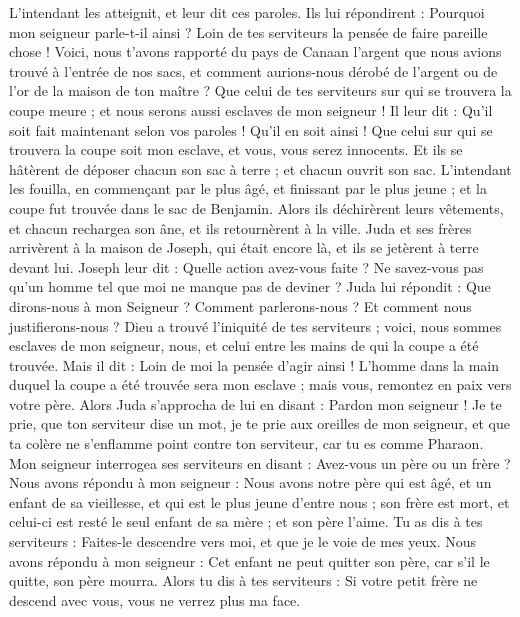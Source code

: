 \begin{multicols}{2}
L’intendant les atteignit, et leur dit ces paroles.
Ils lui répondirent : Pourquoi mon seigneur parle-t-il ainsi ? Loin de tes serviteurs la pensée de faire pareille chose !
Voici, nous t'avons rapporté du pays de Canaan l'argent que nous avions trouvé à l’entrée de nos sacs, et comment aurions-nous dérobé de l'argent ou de l'or de la maison de ton maître ?
Que celui de tes serviteurs sur qui se trouvera la coupe meure ; et nous serons aussi esclaves de mon seigneur !
Il leur dit : Qu'il soit fait maintenant selon vos paroles ! Qu’il en soit ainsi ! Que celui sur qui se trouvera la coupe soit mon esclave, et vous, vous serez innocents.
Et ils se hâtèrent de déposer chacun son sac à terre ; et chacun ouvrit son sac.
L’intendant les fouilla, en commençant par le plus âgé, et finissant par le plus jeune ; et la coupe fut trouvée dans le sac de Benjamin.
Alors ils déchirèrent leurs vêtements, et chacun rechargea son âne, et ils retournèrent à la ville.
Juda et ses frères arrivèrent à la maison de Joseph, qui était encore là, et ils se jetèrent à terre devant lui.
Joseph leur dit : Quelle action avez-vous faite ? Ne savez-vous pas qu'un homme tel que moi ne manque pas de deviner ?
Juda lui répondit : Que dirons-nous à mon Seigneur ? Comment parlerons-nous ? Et comment nous justifierons-nous ? Dieu a trouvé l'iniquité de tes serviteurs ; voici, nous sommes esclaves de mon seigneur, nous, et celui entre les mains de qui la coupe a été trouvée.
Mais il dit : Loin de moi la pensée d’agir ainsi ! L’homme dans la main duquel la coupe a été trouvée sera mon esclave ; mais vous, remontez en paix vers votre père.
Alors Juda s'approcha de lui en disant : Pardon mon seigneur ! Je te prie, que ton serviteur dise un mot, je te prie aux oreilles de mon seigneur, et que ta colère ne s'enflamme point contre ton serviteur, car tu es comme Pharaon.
Mon seigneur interrogea ses serviteurs en disant : Avez-vous un père ou un frère ?
Nous avons répondu à mon seigneur : Nous avons notre père qui est âgé, et un enfant de sa vieillesse, et qui est le plus jeune d'entre nous ; son frère est mort, et celui-ci est resté le seul enfant  de sa mère ; et son père l'aime.
Tu as dis à tes serviteurs : Faites-le descendre vers moi, et que je le voie de mes yeux.
Nous avons répondu  à mon seigneur : Cet enfant ne peut quitter son père, car s'il le quitte, son père mourra.
Alors tu dis à tes serviteurs : Si votre petit frère ne descend avec vous, vous ne verrez plus ma face.

\end{multicols}
